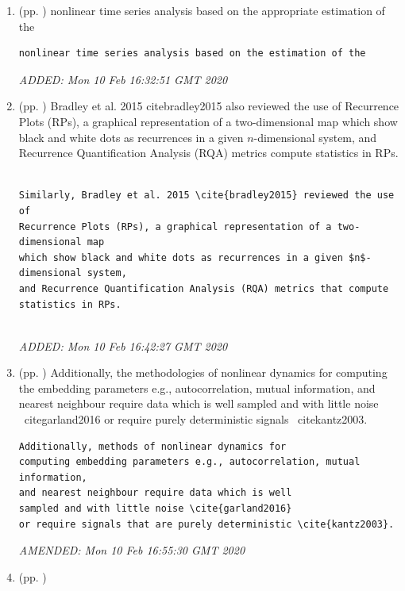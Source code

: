 \documentclass[10pt]{article}
\begin{document}
\begin{enumerate}
\item  (pp. ) 
nonlinear time series analysis based on the appropriate estimation of the 
\begin{verbatim}
nonlinear time series analysis based on the estimation of the 
\end{verbatim}
	\textit{
	ADDED: Mon 10 Feb 16:32:51 GMT 2020
	}
	\\


\item  (pp. ) 
Bradley et al. 2015 cite{bradley2015} also reviewed the use of 
Recurrence Plots (RPs), a graphical representation of a two-dimensional map 
which show black and white dots as recurrences in a given $n$-dimensional system, 
and Recurrence Quantification Analysis (RQA) metrics compute statistics in RPs.


\begin{verbatim}

Similarly, Bradley et al. 2015 \cite{bradley2015} reviewed the use of 
Recurrence Plots (RPs), a graphical representation of a two-dimensional map 
which show black and white dots as recurrences in a given $n$-dimensional system, 
and Recurrence Quantification Analysis (RQA) metrics that compute 
statistics in RPs.


\end{verbatim}
	\textit{
	ADDED: Mon 10 Feb 16:42:27 GMT 2020
	}
	\\




\item  (pp. ) 
Additionally, the methodologies of nonlinear dynamics for 
computing the embedding parameters e.g., autocorrelation, mutual information, 
and nearest neighbour require data which is well 
sampled and with little noise \ cite{garland2016}
or require purely deterministic signals \ cite{kantz2003}.

\begin{verbatim}
Additionally, methods of nonlinear dynamics for 
computing embedding parameters e.g., autocorrelation, mutual information, 
and nearest neighbour require data which is well 
sampled and with little noise \cite{garland2016}
or require signals that are purely deterministic \cite{kantz2003}.

\end{verbatim}
	\textit{
	AMENDED: Mon 10 Feb 16:55:30 GMT 2020
	}
	\\



\item  (pp. ) 


\end{enumerate}
\end{document}

